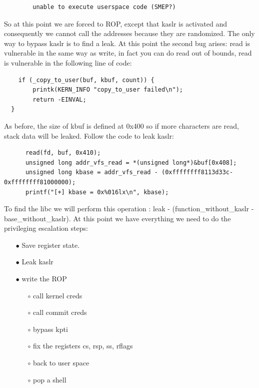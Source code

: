     \begin{verbatim}
        unable to execute userspace code (SMEP?)
    \end{verbatim}
    So at this point we are forced to ROP, except that kaslr is activated and consequently we cannot call the addresses because they are randomized.\newline
    The only way to bypass kaslr is to find a leak.\newline
    At this point the second bug arises: read is vulnerable in the same way as write, in fact you can do read out of bounds, read is vulnerable in the following line of code:\newline
    \begin{verbatim}
    if (_copy_to_user(buf, kbuf, count)) {
        printk(KERN_INFO "copy_to_user failed\n");
        return -EINVAL;
  }
    \end{verbatim}
   As before, the size of kbuf is defined at 0x400 so if more characters are read, stack data will be leaked.\newline 
   Follow the code to leak kaslr:\newline
   \begin{verbatim}
      read(fd, buf, 0x410);
      unsigned long addr_vfs_read = *(unsigned long*)&buf[0x408];
      unsigned long kbase = addr_vfs_read - (0xffffffff8113d33c-0xffffffff81000000);
      printf("[+] kbase = 0x%016lx\n", kbase);
   \end{verbatim}
   To find the libc we will perform this operation : leak - (function\_without\_kaslr - base\_without\_kaslr).\newline
   At this point we have everything we need to do the privileging escalation steps:\newline
    \begin{itemize}
        \item[$\bullet$] Save register state.
        \item[$\bullet$] Leak kaslr  
        \item[$\bullet$] write the ROP   
        \begin{itemize}
            \item[$\circ$] call kernel creds
            \item[$\circ$] call commit creds
            \item[$\circ$] bypass kpti
            \item[$\circ$] fix the registers cs, rsp, ss, rflags
            \item[$\circ$] back to user space 
            \item[$\circ$] pop a shell 
        \end{itemize}
    \end{itemize}
